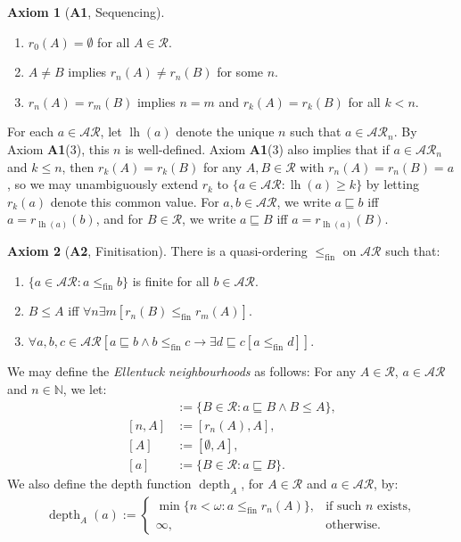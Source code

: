 \documentclass[10pt,a4paper]{amsart}
\theoremstyle{plain}
\numberwithin{equation}{section}
\theoremstyle{definition}
\newtheorem*{axiom}{Axiom}
\newcommand{\func}{\operatorname}
\newcommand{\N}{\mathbb{N}}
\newcommand{\cal}{\mathcal}
\newcommand{\lh}{\func{lh}}
\newcommand{\depth}{\func{depth}}
\newcommand{\fin}{\mathrm{fin}}
\begin{document}
\begin{axiom}[\textbf{A1}, Sequencing]
\hfill
    \begin{enumerate}[label=(\arabic*)]
        \item $r_0(A) = \emptyset$ for all $A \in \cal{R}$.

        \item $A \neq B$ implies $r_n(A) \neq r_n(B)$ for some $n$.

        \item $r_n(A) = r_m(B)$ implies $n = m$ and $r_k(A) = r_k(B)$ for all $k < n$.
    \end{enumerate}
\end{axiom}

For each $a \in \cal{AR}$, let $\lh(a)$ denote the unique $n$ such that $a \in \cal{AR}_n$. By Axiom \textbf{A1}(3), this $n$ is well-defined. Axiom \textbf{A1}(3) also implies that if $a \in \cal{AR}_n$ and $k \leq n$, then $r_k(A) = r_k(B)$ for any $A,B \in \cal{R}$ with $r_n(A) = r_n(B) = a$, so we may unambiguously extend $r_k$ to $\{a \in \cal{AR} : \lh(a) \geq k\}$ by letting $r_k(a)$ denote this common value. For $a,b \in \cal{AR}$, we write $a \sqsubseteq b$ iff $a = r_{\lh(a)}(b)$, and for $B \in \cal{R}$, we write $a \sqsubseteq B$ iff $a = r_{\lh(a)}(B)$.

\begin{axiom}[\textbf{A2}, Finitisation]
    There is a quasi-ordering $\leq_\fin$ on $\cal{AR}$ such that:
    \begin{enumerate}[label=(\arabic*)]
        \item $\{a \in \cal{AR} : a \leq_\fin b\}$ is finite for all $b \in \cal{AR}$.

        \item $B \leq A$ iff $\forall n \exists m [r_n(B) \leq_\fin r_m(A)]$.

        \item $\forall a,b,c \in \cal{AR}[a \sqsubseteq b \wedge b \leq_\fin c \to \exists d \sqsubseteq c[a \leq_\fin d]]$.
    \end{enumerate}
\end{axiom}

We may define the \emph{Ellentuck neighbourhoods} as follows: For any $A \in \cal{R}$, $a \in \cal{AR}$ and $n \in \N$, we let:
\begin{align*}
    [a,A] &:= \{B \in \cal{R} : a \sqsubseteq B \wedge B \leq A\}, \\
    [n,A] &:= [r_n(A),A], \\
    [A] &:= [\emptyset,A], \\
    [a] &:= \{B \in \cal{R} : a \sqsubseteq B\}.
\end{align*}
We also define the depth function $\depth_A$, for $A \in \cal{R}$ and $a \in \cal{AR}$, by:
\begin{align*}
    \depth_A(a) := 
    \begin{cases}
        \min\{n < \omega : a \leq_\fin r_n(A)\}, &\text{if such $n$ exists}, \\
        \infty, &\text{otherwise}.
    \end{cases}
\end{align*}
\end{document}
